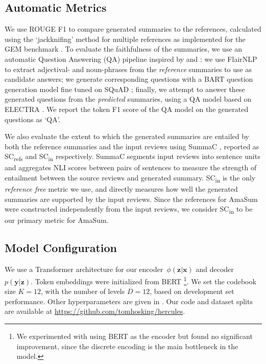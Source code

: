 \documentclass[11pt]{article}
\begin{document}
\subsection{Automatic Metrics}

We use ROUGE F1 \cite[][\mbox{R-2/R-L} in Tables \ref{tab:automatic_general} and \ref{tab:aspect_scores}]{lin-2004-rouge} to compare generated summaries to the references, calculated using the `jackknifing' method for multiple references as implemented for the GEM benchmark \cite{gehrmann-etal-2021-gem}. To evaluate the faithfulness of the summaries, we use an automatic Question Answering (QA) pipeline inspired by \citet{fabbri-etal-2022-qafacteval} and \citet{deutsch-etal-2021-towards}: we use FlairNLP \cite{flair} to extract adjectival- and noun-phrases from the \textit{reference} summaries to use as candidate answers; we generate corresponding questions with a BART question generation model fine tuned on SQuAD \cite{lewis-etal-2020-bart, rajpurkar-etal-2016-squad}; finally, we attempt to answer these generated questions from the \textit{predicted} summaries, using a QA model based on ELECTRA \cite{clark2020electra,bartolo-etal-2021-improving}. We report the token F1 score of the QA model on the generated questions as `QA'.

We also evaluate the extent to which the generated summaries are entailed by both the reference summaries and the input reviews using SummaC \cite{laban-etal-2022-summac}, reported as SC\textsubscript{refs} and SC\textsubscript{in} respectively. SummaC segments input reviews into sentence units and aggregates NLI scores between pairs of sentences to measure the strength of entailment between the source reviews and generated summary. SC\textsubscript{in} is the only \textit{reference free} metric we use, and directly measures how well the generated summaries are supported by the input reviews. Since the references for AmaSum were constructed independently from the input reviews, we consider SC\textsubscript{in} to be our primary metric for AmaSum.


\subsection{Model Configuration}

We use a Transformer architecture \cite{Vaswani2017} for our encoder~$\phi(\textbf{z} | \textbf{x})$ and decoder~$p(\textbf{y} | \textbf{z})$. Token embeddings were initialized from BERT \cite{devlin-etal-2019-bert}\footnote{We experimented with using BERT as the encoder but found no significant improvement, since the discrete encoding is the main bottleneck in the model.}. We set the codebook size $K = 12$, with the number of levels $D = 12$, based on development set performance. Other hyperparameters are given in . Our code and dataset splits are available at \mbox{\url{https://github.com/tomhosking/hercules}}.
 
\end{document}
